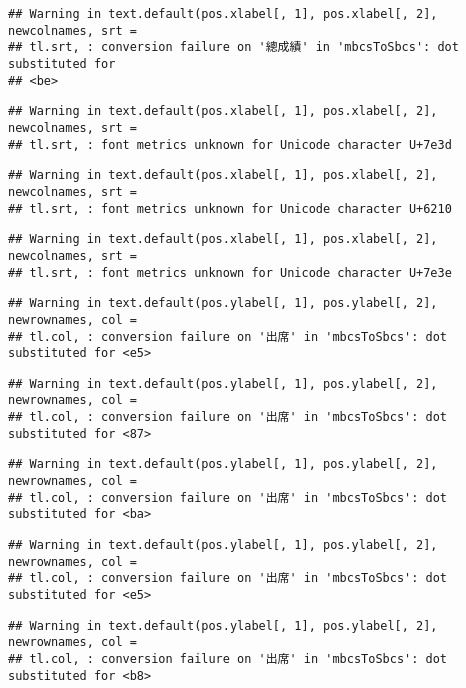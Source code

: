 \documentclass[
]{book}
\begin{document}
\begin{verbatim}
## Warning in text.default(pos.xlabel[, 1], pos.xlabel[, 2], newcolnames, srt =
## tl.srt, : conversion failure on '總成績' in 'mbcsToSbcs': dot substituted for
## <be>
\end{verbatim}

\begin{verbatim}
## Warning in text.default(pos.xlabel[, 1], pos.xlabel[, 2], newcolnames, srt =
## tl.srt, : font metrics unknown for Unicode character U+7e3d
\end{verbatim}

\begin{verbatim}
## Warning in text.default(pos.xlabel[, 1], pos.xlabel[, 2], newcolnames, srt =
## tl.srt, : font metrics unknown for Unicode character U+6210
\end{verbatim}

\begin{verbatim}
## Warning in text.default(pos.xlabel[, 1], pos.xlabel[, 2], newcolnames, srt =
## tl.srt, : font metrics unknown for Unicode character U+7e3e
\end{verbatim}

\begin{verbatim}
## Warning in text.default(pos.ylabel[, 1], pos.ylabel[, 2], newrownames, col =
## tl.col, : conversion failure on '出席' in 'mbcsToSbcs': dot substituted for <e5>
\end{verbatim}

\begin{verbatim}
## Warning in text.default(pos.ylabel[, 1], pos.ylabel[, 2], newrownames, col =
## tl.col, : conversion failure on '出席' in 'mbcsToSbcs': dot substituted for <87>
\end{verbatim}

\begin{verbatim}
## Warning in text.default(pos.ylabel[, 1], pos.ylabel[, 2], newrownames, col =
## tl.col, : conversion failure on '出席' in 'mbcsToSbcs': dot substituted for <ba>
\end{verbatim}

\begin{verbatim}
## Warning in text.default(pos.ylabel[, 1], pos.ylabel[, 2], newrownames, col =
## tl.col, : conversion failure on '出席' in 'mbcsToSbcs': dot substituted for <e5>
\end{verbatim}

\begin{verbatim}
## Warning in text.default(pos.ylabel[, 1], pos.ylabel[, 2], newrownames, col =
## tl.col, : conversion failure on '出席' in 'mbcsToSbcs': dot substituted for <b8>
\end{verbatim}
\end{document}
